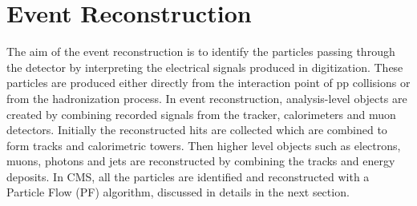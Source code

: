 \section{Event Reconstruction}
The aim of the event reconstruction is to identify the particles passing through the detector by interpreting the electrical signals produced in digitization. These particles are produced either directly from the interaction point of pp collisions or from the hadronization process. In event reconstruction, analysis-level objects are created by combining recorded signals from the tracker, calorimeters and muon detectors. Initially the reconstructed hits are collected which are combined to form tracks and calorimetric towers. Then higher level objects such as electrons, muons, photons and jets are reconstructed by combining the tracks and energy deposits. In CMS, all the particles are identified and reconstructed with a Particle Flow (PF) algorithm, discussed in details in the next section.

